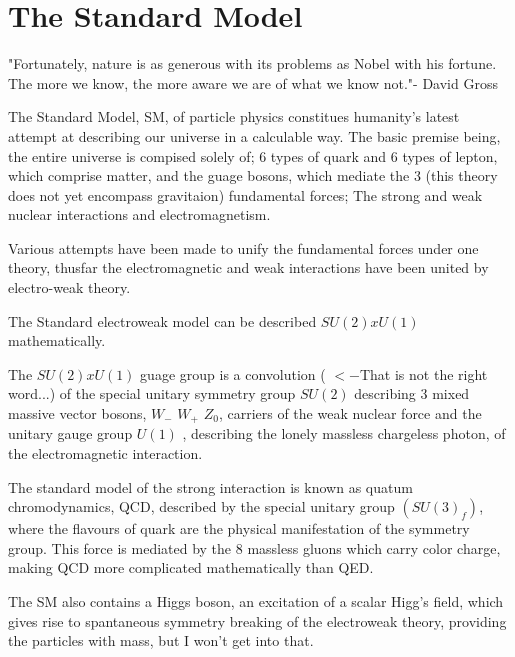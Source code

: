 \section{The Standard Model}\label{secSM:ch1}

"Fortunately, nature is as generous with its problems as Nobel with his fortune. The more we know, the more aware we are of what we know not."- David Gross \newline

The Standard Model, SM, of particle physics constitues humanity's latest attempt at describing our universe in a calculable way. The basic premise being, the entire universe is compised solely of; 6 types of quark and 6 types of lepton, which comprise matter, and the guage bosons, which mediate the 3 (this theory does not yet encompass gravitaion) fundamental forces; The strong and weak nuclear interactions and electromagnetism. 


Various attempts have been made to unify the fundamental forces under one theory, thusfar the electromagnetic and weak interactions have been united by electro-weak theory. 

The Standard electroweak model can be described $SU(2) x U(1)$ mathematically.

The  $SU(2) x U(1)$ guage group is a convolution ( $<- $That is not the right word...) of the special unitary symmetry group $SU(2)$ describing 3 mixed massive vector bosons, $W_{-}$ $W_{+}$ $Z_0$, carriers of the weak nuclear force and the unitary gauge group $U(1)$ , describing the lonely massless chargeless photon, of the electromagnetic interaction.

The standard model of the strong interaction is known as quatum chromodynamics, QCD, described by the special unitary group $(SU(3)_f)$, where the  flavours of quark are the physical manifestation of the symmetry group. This force is mediated by the 8 massless gluons which carry color charge, making QCD more complicated mathematically than QED.

The SM also contains a Higgs boson, an excitation of a scalar Higg's field, which gives rise to spantaneous symmetry breaking of the electroweak theory, providing the particles with mass, but I won't get into that. 


